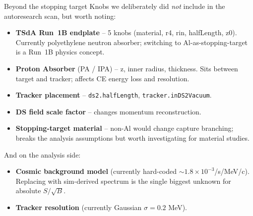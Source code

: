 \documentclass[10pt,aspectratio=169]{beamer}
\begin{document}
\begin{frame}{Beyond the stopping target}
Knobs we deliberately did \emph{not} include in the autoresearch scan, but worth
noting:

\medskip
\begin{itemize}
\item \textbf{TSdA Run~1B endplate} -- 5 knobs (material, r4, rin, halfLength, z0).
      Currently polyethylene neutron absorber; switching to Al-as-stopping-target is
      a Run~1B physics concept.
\item \textbf{Proton Absorber} (PA / IPA) -- z, inner radius, thickness.
      Sits between target and tracker; affects CE energy loss and resolution.
\item \textbf{Tracker placement} -- \texttt{ds2.halfLength}, \texttt{tracker.inDS2Vacuum}.
\item \textbf{DS field scale factor} -- changes momentum reconstruction.
\item \textbf{Stopping-target material} -- non-Al would change capture branching;
      breaks the analysis assumptions but worth investigating for material studies.
\end{itemize}

\medskip
And on the analysis side:
\begin{itemize}
\item \textbf{Cosmic background model} (currently hard-coded $\sim 1.8\times 10^{-3}$/s/MeV/c).
      Replacing with sim-derived spectrum is the single biggest unknown for absolute $S/\sqrt{B}$.
\item \textbf{Tracker resolution} (currently Gaussian $\sigma\!=\!0.2$ MeV).
\end{itemize}
\end{frame}
\end{document}
